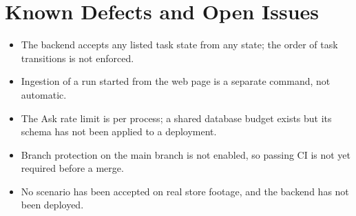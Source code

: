 \section{Known Defects and Open Issues}
\begin{itemize}
\item The backend accepts any listed task state from any state; the order of task transitions is not enforced.
\item Ingestion of a run started from the web page is a separate command, not automatic.
\item The Ask rate limit is per process; a shared database budget exists but its schema has not been applied to a deployment.
\item Branch protection on the main branch is not enabled, so passing CI is not yet required before a merge.
\item No scenario has been accepted on real store footage, and the backend has not been deployed.
\end{itemize}
